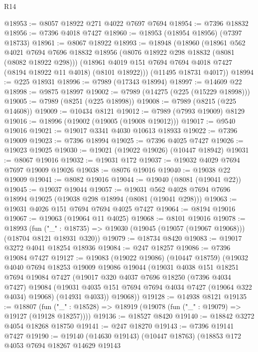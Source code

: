 \begin{lexlean}{R14}
\begin{coremodule}
@18953 := @8057 @18922 @271 @4022 @7697 @7694
@18954 := @7396 @18832
@18956 := @7396 @4018 @7427
@18960 := @18953 (@18954 @18956) (@7397 @18733)
@18961 := @8067 @18922
@18993 := @18948
    (@18960
      (@18961
        @562
        @4021
        @7694
        @7696
        @18832
        @18956
        (@8076 @18922 @298 @18832 (@8081 (@8082 @18922 @298)))
        (@18961 @4019 @151 @7694 @7694 @4018 @7427 (@8194 @18922 @11 @4018) (@8101 @18922)))
      (@11495 @18731 @4017))
@18994 := @225 @18931
@18996 := @7989 (@17343 @18994)
@18997 := @14609 @22
@18998 := @9875 @18997
@19002 := @7989 (@14275 (@225 (@15229 @18998)))
@19005 := @7989 (@8251 (@225 @18998))
@19008 := @7989 (@8215 (@225 @14608))
@19009 := @10434 @8121
@19012 := @7989 (@7993 @19009) @8129
@19016 := @18996 (@19002 (@19005 (@19008 @19012)))
@19017 := @9540 @19016
@19021 := @19017 @3341 @4030 @10613 @18933
@19022 := @7396 @19009
@19023 := @7396 @18994
@19025 := @7396 @4025 @7427
@19026 := @19023 @19025
@19030 := @19021 (@19022 @19026) (@10447 @18942)
@19031 := @8067 @19016
@19032 := @19031 @172
@19037 := @19032 @4029 @7694 @7697 @19009 @19026
@19038 := @8076 @19016
@19040 := @19038 @22 @19009
@19041 := @8082 @19016
@19044 := @19040 (@8081 (@19041 @22))
@19045 := @19037 @19044
@19057 := @19031 @562 @4028 @7694 @7696 @18994 @19025 (@19038 @298 @18994 (@8081 (@19041 @298)))
@19063 := @19031 @4026 @151 @7694 @7694 @4025 @7427
@19064 := @8194 @19016
@19067 := @19063 (@19064 @11 @4025)
@19068 := @8101 @19016
@19078 := @18993
    (fun ("_" : @18735) => @19030 (@19045 (@19057 (@19067 @19068))) (@18704 @8121 @18931 @320))
@19079 := @18734 @8420
@19083 := @19017 @3272 @4041 @18254 @18936
@19084 := @247 @18257
@19086 := @7396 @19084 @7427
@19127 := @19083
    (@19022 @19086)
    (@10447 @18759)
    (@19032
      @4040
      @7694
      @18253
      @19009
      @19086
      @19044
      (@19031
        @4038
        @151
        @18251
        @7694
        @19084
        @7427
        (@19017
          @320
          @4037
          @7696
          @18250
          (@7396 @4034 @7427)
          @19084
          (@19031 @4035 @151 @7694 @7694 @4034 @7427 (@19064 @322 @4034) @19068)
          (@14931 @4033))
        @19068))
@19128 := @14938 @8121
@19135 := @18807
    (fun ("_" : @18528) => @18919 (@19078 (fun ("_" : @19079) => @19127 (@19128 @18257))))
@19136 := @18527 @8420
@19140 := @18842 @3272 @4054 @18268 @18750
@19141 := @247 @18270
@19143 := @7396 @19141 @7427
@19190 := @19140
    (@14630 @19143)
    (@10447 @18763)
    (@18853
      @172
      @4053
      @7694
      @18267
      @14629
      @19143

\end{coremodule}
\end{lexlean}
